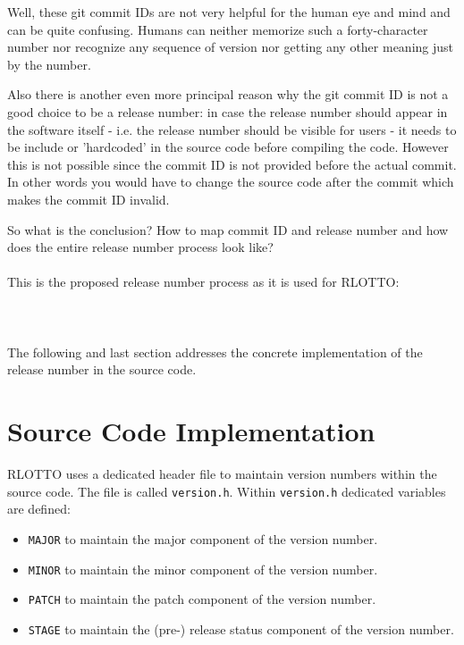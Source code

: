 \documentclass[10pt,a4paper]{article}
\begin{document}
Well, these git commit IDs are not very helpful for the human eye and mind and can be quite confusing. Humans can neither memorize such a forty-character number nor recognize any sequence of version nor getting any other meaning just by the number.

Also there is another even more principal reason why the git commit ID is not a good choice to be a release number: in case the release number should appear in the software itself - i.e. the release number should be visible for users - it needs to be include or 'hardcoded' in the source code before compiling the code. However this is not possible since the commit ID is not provided before the actual commit. In other words you would have to change the source code after the commit which makes the commit ID invalid.

So what is the conclusion? How to map commit ID and release number and how does the entire release number process look like?
\\
\\
This is the proposed release number process as it is used for RLOTTO:
\\
 
\\
\\ 
\\ 
The following and last section addresses the concrete implementation of the release number in the source code.

\section*{Source Code Implementation}


RLOTTO uses a dedicated header file to maintain version numbers within the source code. The file is called \texttt{version.h}. Within \texttt{version.h} dedicated variables are defined:
\begin{itemize}
\item \texttt{MAJOR} to maintain the major component of the version number.
\item \texttt{MINOR} to maintain the minor component of the version number.
\item \texttt{PATCH} to maintain the patch component of the version number.
\item \texttt{STAGE} to maintain the (pre-) release status component of the version number.
\end{itemize}
\end{document}
